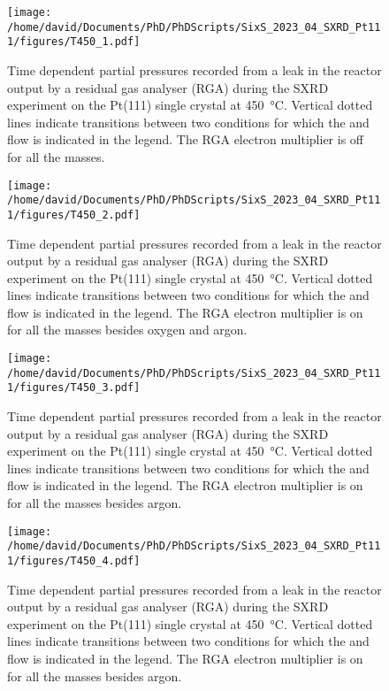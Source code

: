 \begin{figure}[!htb]
    \centering
    \texttt{[image: /home/david/Documents/PhD/PhDScripts/SixS\_2023\_04\_SXRD\_Pt111/figures/T450\_1.pdf]}
    \caption{
        Time dependent partial pressures recorded from a leak in the reactor output by a residual gas analyser (RGA) during the SXRD experiment on the Pt(111) single crystal at \qty{450}{\degreeCelsius}.
        Vertical dotted lines indicate transitions between two conditions for which the  and  flow is indicated in the legend.
        The RGA electron multiplier is off for all the masses.
    }
    \label{fig:RGA450Pt111_1}
\end{figure}

\begin{figure}[!htb]
    \centering
    \texttt{[image: /home/david/Documents/PhD/PhDScripts/SixS\_2023\_04\_SXRD\_Pt111/figures/T450\_2.pdf]}
    \caption{
        Time dependent partial pressures recorded from a leak in the reactor output by a residual gas analyser (RGA) during the SXRD experiment on the Pt(111) single crystal at \qty{450}{\degreeCelsius}.
        Vertical dotted lines indicate transitions between two conditions for which the  and  flow is indicated in the legend.
        The RGA electron multiplier is on for all the masses besides oxygen and argon.
    }
    \label{fig:RGA450Pt111_2}
\end{figure}

\begin{figure}[!htb]
    \centering
    \texttt{[image: /home/david/Documents/PhD/PhDScripts/SixS\_2023\_04\_SXRD\_Pt111/figures/T450\_3.pdf]}
    \caption{
        Time dependent partial pressures recorded from a leak in the reactor output by a residual gas analyser (RGA) during the SXRD experiment on the Pt(111) single crystal at \qty{450}{\degreeCelsius}.
        Vertical dotted lines indicate transitions between two conditions for which the  and  flow is indicated in the legend.
        The RGA electron multiplier is on for all the masses besides argon.
    }
    \label{fig:RGA450Pt111_3}
\end{figure}

\begin{figure}[!htb]
    \centering
    \texttt{[image: /home/david/Documents/PhD/PhDScripts/SixS\_2023\_04\_SXRD\_Pt111/figures/T450\_4.pdf]}
    \caption{
        Time dependent partial pressures recorded from a leak in the reactor output by a residual gas analyser (RGA) during the SXRD experiment on the Pt(111) single crystal at \qty{450}{\degreeCelsius}.
        Vertical dotted lines indicate transitions between two conditions for which the  and  flow is indicated in the legend.
        The RGA electron multiplier is on for all the masses besides argon.
    }
    \label{fig:RGA450Pt111_4}
\end{figure}